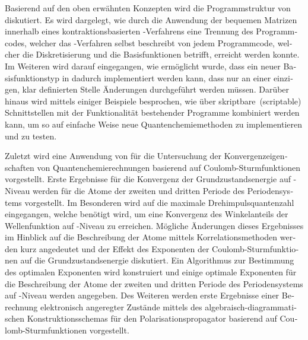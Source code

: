 \begin{otherlanguage}{ngerman}
Basierend auf den oben erwähnten Konzepten wird die Programmstruktur
von \molsturm diskutiert.
Es wird dargelegt, wie durch die Anwendung der bequemen Matrizen
innerhalb eines kontraktionsbasierten \SCF-Verfahrens
eine Trennung des Programmcodes,
welcher das \SCF-Verfahren selbst beschreibt
von jedem Programmcode, welcher die Diskretisierung und die Basisfunktionen betrifft,
erreicht werden konnte.
Im Weiteren wird darauf eingegangen,
wie ermöglicht wurde, dass ein neuer Basisfunktionstyp
in \molsturm dadurch implementiert werden kann,
dass nur an einer einzigen, klar definierten Stelle
Änderungen durchgeführt werden müssen.
Darüber hinaus wird mittels einiger Beispiele besprochen,
wie \molsturm über skriptbare~(scriptable) Schnittstellen
mit der Funktionalität bestehender Programme kombiniert werden kann,
um so auf einfache Weise neue Quantenchemiemethoden zu implementieren und zu testen.

Zuletzt wird eine Anwendung von \molsturm für
die Untersuchung der Konvergenzeigenschaften
von Quantenchemierechnungen basierend auf Coulomb-Sturmfunktionen vorgestellt.
Erste Ergebnisse für die Konvergenz der Grundzustandsenergie auf \HF-Niveau
werden für die Atome der zweiten und dritten Periode des Periodensystems vorgestellt.
Im Besonderen wird auf die maximale Drehimpulsquantenzahl eingegangen,
welche benötigt wird,
um eine Konvergenz des Winkelanteils der Wellenfunktion
auf \HF-Niveau zu erreichen.
Mögliche Änderungen dieses Ergebnisses im Hinblick auf die Beschreibung
der Atome mittels Korrelationsmethoden werden kurz angedeutet
und der Effekt des Exponenten der Coulomb-Sturmfunktionen
auf die Grundzustandsenergie diskutiert.
Ein Algorithmus zur Bestimmung des optimalen Exponenten wird konstruiert
und einige optimale Exponenten für die Beschreibung der Atome
der zweiten und dritten Periode des Periodensystems
auf \HF-Niveau werden angegeben.
Des Weiteren werden erste Ergebnisse einer Berechnung elektronisch
angeregter Zustände
mittels des algebraisch-diagrammatischen Konstruktionsschemas
für den Polarisationspropagator basierend auf Coulomb-Sturmfunktionen vorgestellt.
\end{otherlanguage}
